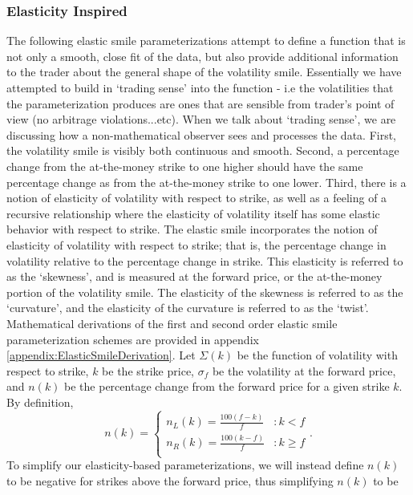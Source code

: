 \documentclass[12pt, a4paper, notitlepage]{article}
\numberwithin{equation}{subsection}
\numberwithin{figure}{subsection}
\numberwithin{table}{subsection}
\newcommand{\newpar}{\newline \newline}
\begin{document}
\subsubsection{Elasticity Inspired}\label{subsec:ElasticityParameterizations}
The following elastic smile parameterizations attempt to define a function that is not only a smooth, close fit of the data, but also provide additional information to the trader about the general shape of the volatility smile.  Essentially we have attempted to build in `trading sense' into the function - i.e the volatilities that the parameterization produces are ones that are sensible from trader's point of view (no arbitrage violations...etc).
\newpar
When we talk about `trading sense', we are discussing how a non-mathematical observer sees and processes the data.  First, the volatility smile is visibly both continuous and smooth.  Second, a percentage change from the at-the-money strike to one higher should have the same percentage change as from the at-the-money strike to one lower.  Third, there is a notion of elasticity of volatility with respect to strike, as well as a feeling of a recursive relationship where the elasticity of volatility itself has some elastic behavior with respect to strike.
\newpar
The elastic smile incorporates the notion of elasticity of volatility with respect to strike; that is, the percentage change in volatility relative to the percentage change in strike.  This elasticity is referred to as the `skewness', and is measured at the forward price, or the at-the-money portion of the volatility smile.  The elasticity of the skewness is referred to as the `curvature', and the elasticity of the curvature is referred to as the `twist'.  Mathematical derivations of the first and second order elastic smile parameterization schemes are provided in appendix \ref{appendix:ElasticSmileDerivation}.
\newpar
Let $\Sigma(k)$ be the function of volatility with respect to strike, $k$ be the strike price, $\sigma_f$ be the volatility at the forward price, and $n(k)$ be the percentage change from the forward price for a given strike $k$.  By definition,
\begin{equation*}
n(k) = 	\begin{cases}
			n_L(k) = \frac{100\left(f-k\right)}{f} & : k < f\\
            n_R(k) = \frac{100\left(k-f\right)}{f} & : k \geq f\\
		\end{cases}.
\end{equation*}
To simplify our elasticity-based parameterizations, we will instead define $n(k)$ to be negative for strikes above the forward price, thus simplifying $n(k)$ to be
\end{document}
